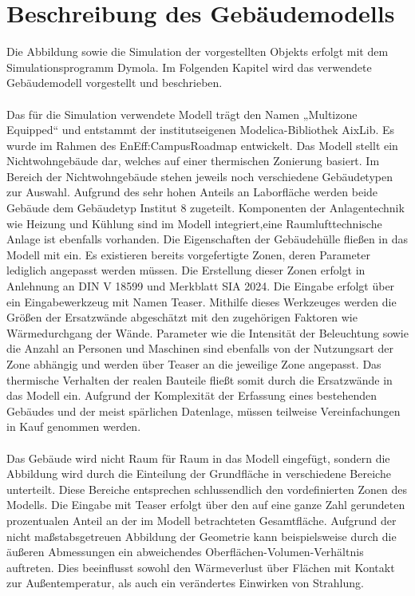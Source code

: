 \chapter{Beschreibung des Gebäudemodells}
\label{cha:Beschreibung des Gebäudemodells}

Die Abbildung sowie die Simulation der vorgestellten Objekts erfolgt mit dem Simulationsprogramm Dymola. Im Folgenden Kapitel wird das verwendete Gebäudemodell vorgestellt und beschrieben. \\
\\
Das für die Simulation verwendete Modell trägt den Namen „Multizone Equipped“ und entstammt der institutseigenen Modelica-Bibliothek AixLib. Es wurde im Rahmen des EnEff:CampusRoadmap entwickelt. Das Modell stellt ein Nichtwohngebäude dar, welches auf einer thermischen Zonierung basiert. Im Bereich der Nichtwohngebäude stehen jeweils noch verschiedene Gebäudetypen zur Auswahl. Aufgrund des sehr hohen Anteils an Laborfläche werden beide Gebäude dem Gebäudetyp Institut 8 zugeteilt. Komponenten der Anlagentechnik wie Heizung und  Kühlung sind im Modell integriert,eine Raumlufttechnische Anlage ist ebenfalls vorhanden. Die Eigenschaften der Gebäudehülle fließen in das Modell mit ein. Es existieren bereits vorgefertigte Zonen, deren Parameter lediglich angepasst werden müssen. Die Erstellung dieser Zonen erfolgt in Anlehnung an DIN V 18599 und Merkblatt SIA 2024. Die Eingabe erfolgt über ein Eingabewerkzeug mit Namen Teaser. Mithilfe dieses Werkzeuges werden die Größen der Ersatzwände abgeschätzt mit den zugehörigen Faktoren wie Wärmedurchgang der Wände. Parameter wie die Intensität der Beleuchtung sowie die Anzahl an Personen und Maschinen sind ebenfalls von der Nutzungsart der Zone abhängig und werden über Teaser an die jeweilige Zone angepasst. Das thermische Verhalten der realen Bauteile fließt somit durch die Ersatzwände in das Modell ein.  Aufgrund der Komplexität der Erfassung eines bestehenden Gebäudes und der meist spärlichen Datenlage, müssen teilweise Vereinfachungen in Kauf genommen werden.\\
\\
Das Gebäude wird nicht Raum für Raum in das Modell eingefügt, sondern die Abbildung wird durch die Einteilung der Grundfläche in verschiedene Bereiche unterteilt. Diese Bereiche entsprechen schlussendlich den vordefinierten Zonen des Modells. 
Die Eingabe mit Teaser erfolgt über den auf eine ganze Zahl gerundeten prozentualen Anteil an der im Modell betrachteten Gesamtfläche. 
Aufgrund der nicht maßstabsgetreuen Abbildung der Geometrie kann beispielsweise durch die äußeren Abmessungen ein abweichendes Oberflächen-Volumen-Verhältnis auftreten. Dies beeinflusst sowohl den Wärmeverlust über Flächen mit Kontakt zur Außentemperatur, als auch ein verändertes Einwirken von Strahlung.\\
